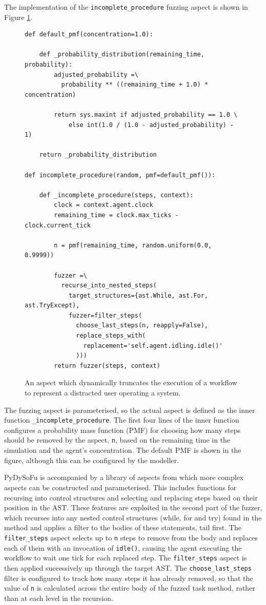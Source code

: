 \documentclass{llncs}
\begin{document}
The implementation of the \lstinline!incomplete_procedure! fuzzing aspect is shown in Figure
\ref{fig:distraction-fuzzer}.%
\begin{figure}[t]
  \centering
\begin{lstlisting}
def default_pmf(concentration=1.0):

    def _probability_distribution(remaining_time, probability):
        adjusted_probability =\
          probability ** ((remaining_time + 1.0) * concentration)

        return sys.maxint if adjusted_probability == 1.0 \
            else int(1.0 / (1.0 - adjusted_probability) - 1)

    return _probability_distribution

def incomplete_procedure(random, pmf=default_pmf()):

    def _incomplete_procedure(steps, context):
        clock = context.agent.clock
        remaining_time = clock.max_ticks - clock.current_tick

        n = pmf(remaining_time, random.uniform(0.0, 0.9999))

        fuzzer =\
          recurse_into_nested_steps(
            target_structures={ast.While, ast.For, ast.TryExcept),
            fuzzer=filter_steps(
              choose_last_steps(n, reapply=False),
              replace_steps_with(
                replacement='self.agent.idling.idle()'
              )))
        return fuzzer(steps, context)
\end{lstlisting}
  \caption{An aspect which dynamically truncates the execution of a workflow to represent a distracted user operating a
    system.}
  \label{fig:distraction-fuzzer}
\end{figure}
The fuzzing aspect is parameterised, so the actual aspect is defined as the inner
function \lstinline!_incomplete_procedure!.  The first four lines of the inner function configures a probability mass
function (PMF) for choosing how many steps should be removed by the aspect, \lstinline!n!, based on the remaining time
in the simulation and the agent's concentration. The default PMF is shown in the figure, although this can be configured
by the modeller.

PyDySoFu is accompanied by a library of aspects from which more complex aspects can be constructed and parameterised.
This includes functions for recursing into control structures and selecting and replacing steps based on their position
in the AST.  These features are exploited in the second part of the fuzzer, which recurses into any nested control
structures (while, for and try) found in the method and applies a filter to the bodies of these statements, tail first.
The \lstinline!filter_steps! aspect selects up to \lstinline!n! steps to remove from the body and replaces each of them
with an invocation of \lstinline!idle()!, causing the agent executing the workflow to wait one tick for each replaced
step.  The \lstinline!filter_steps! aspect is then applied successively up through the target AST.  The
\lstinline!choose_last_steps! filter is configured to track how many steps it has already removed, so that the value of
\lstinline!n! is calculated across the entire body of the fuzzed task method, rather than at each level in the
recursion.
\end{document}
